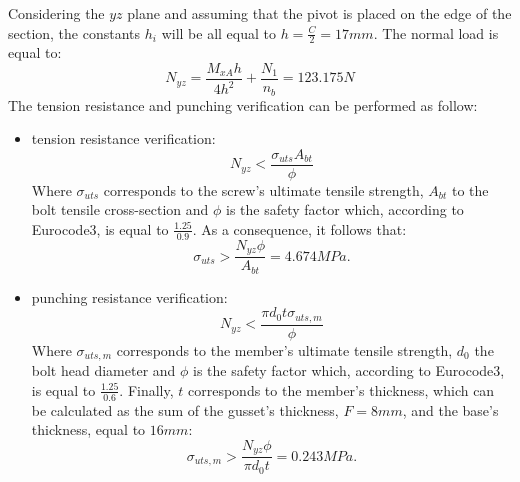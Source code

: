 Considering the $yz$ plane and assuming that the pivot is placed on the edge of the section, the constants $h_{i}$ will be all equal to $h = \frac{C}{2} = 17 mm$.
The normal load is equal to:
\begin{equation*}
    N_{yz} = \frac{M_{xA}h}{4h^{2}} + \frac{N_{1}}{n_{b}} = 123.175 N
\end{equation*}
The tension resistance and punching verification can be performed as follow:
\begin{itemize}
    \item tension resistance verification:
    \begin{equation*}
        N_{yz} < \frac{\sigma_{uts}A_{bt}}{\phi}
    \end{equation*}
    Where $\sigma_{uts}$ corresponds to the screw's ultimate tensile strength, $A_{bt}$ to the bolt tensile cross-section and $\phi$ is the safety factor which, according to Eurocode3, is equal to $\frac{1.25}{0.9}$. As a consequence, it follows that:
    \begin{equation*}
       \sigma_{uts} > \frac{N_{yz}\phi}{A_{bt}} = 4.674MPa.
    \end{equation*}
    \item punching resistance verification:
    \begin{equation*}
        N_{yz} < \frac{\pi d_{0} t \sigma_{uts,m}}{\phi}
    \end{equation*}
    Where $\sigma_{uts,m}$ corresponds to the member's ultimate tensile strength, $d_{0}$ the bolt head diameter and $\phi$ is the safety factor which, according to Eurocode3, is equal to $\frac{1.25}{0.6}$. Finally, $t$ corresponds to the member's thickness, which can be calculated as the sum of the gusset's thickness, $F = 8 mm$, and the base's thickness, equal to $16 mm$:
     \begin{equation*}
       \sigma_{uts,m} > \frac{N_{yz}\phi}{\pi d_{0}t} = 0.243 MPa.
    \end{equation*}
\end{itemize}

